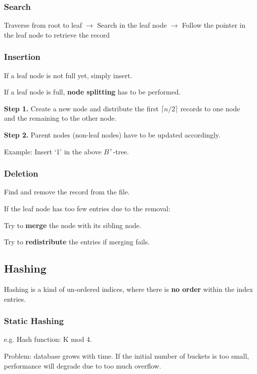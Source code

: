 \documentclass[11pt,a4paper]{article}
\begin{document}
\subsubsection{Search}
Traverse from root to leaf $\rightarrow$ Search in the leaf node $\rightarrow$ Follow the pointer in the leaf node to retrieve the record

\subsubsection{Insertion}
If a leaf node is not full yet, simply insert. \par
If a leaf node is full, \textbf{node splitting} has to be performed.

\textbf{Step 1.} Create a new node and distribute the first $\lceil n/2 \rceil$ records to one node and the remaining to the other node. \par
\textbf{Step 2.} Parent nodes (non-leaf nodes) have to be updated accordingly.

Example: Insert `1' in the above $B^+$-tree. \par


\subsubsection{Deletion}
Find and remove the record from the file. \par
If the leaf node has too few entries due to the removal: \par
\qquad Try to \textbf{merge} the node with its sibling node. \par
\qquad Try to \textbf{redistribute} the entries if merging fails. \par

\subsection{Hashing}
Hashing is a kind of un-ordered indices, where there is \textbf{no order} within the index entries. \par

\subsubsection{Static Hashing}
e.g. Hash function: K mod 4.

Problem: database grows with time. If the initial number of buckets is too small, performance will degrade due to too much overflow.
\end{document}
